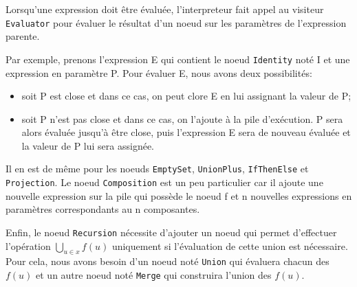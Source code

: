 \documentclass[a4paper, 11pt]{article}
\begin{document}
Lorsqu'une expression doit être évaluée, l'interpreteur fait appel au visiteur 
\lstinline{Evaluator} pour évaluer le résultat d'un noeud sur les paramètres de
l'expression parente.

Par exemple, prenons l'expression E qui contient le noeud \lstinline{Identity}
noté I et une expression en paramètre P. Pour évaluer E, nous avons deux 
possibilités: 

\begin{itemize}
    \item soit P est close et dans ce cas, on peut clore E en lui assignant la valeur de P;
    \item soit P n'est pas close et dans ce cas, on l'ajoute à la pile d'exécution.
    P sera alors évaluée jusqu'à être close, puis l'expression E sera de nouveau
    évaluée et la valeur de P lui sera assignée.
\end{itemize}

Il en est de même pour les noeuds \lstinline{EmptySet}, \lstinline{UnionPlus},
\lstinline{IfThenElse} et \lstinline{Projection}.
Le noeud \lstinline{Composition} est un peu particulier car il ajoute 
une nouvelle expression sur la pile qui possède le noeud f et n nouvelles 
expressions en paramètres correspondants au n composantes.

Enfin, le noeud \lstinline{Recursion} nécessite d'ajouter un noeud 
qui permet d'effectuer l'opération 
$\displaystyle\bigcup_{u \in x} f(u)$ uniquement si l'évaluation de cette union
est nécessaire. Pour cela, nous avons besoin d'un noeud noté 
\lstinline{Union} qui évaluera chacun des $f(u)$ et un autre noeud noté 
\lstinline{Merge} qui construira l'union des $f(u)$.
\end{document}
